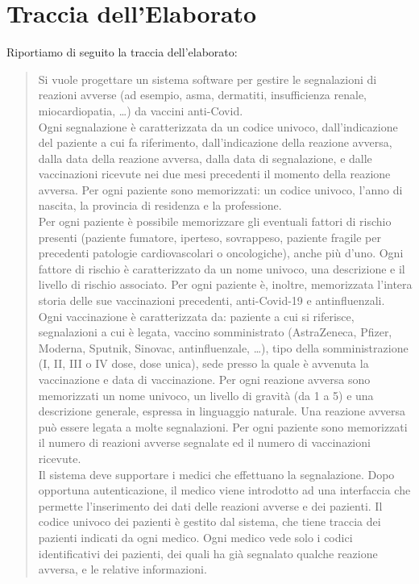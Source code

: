 \documentclass[11pt]{article}
\begin{document}
    \section{Traccia dell'Elaborato}
    Riportiamo di seguito la traccia dell'elaborato:
        \begin{quotation}
            Si vuole progettare un sistema software per gestire le segnalazioni di reazioni avverse (ad esempio, asma, dermatiti, insufficienza renale, miocardiopatia, \dots) da vaccini anti-Covid.\\
            Ogni segnalazione è caratterizzata da un codice univoco, dall'indicazione del paziente a cui fa riferimento, dall'indicazione della reazione avversa, dalla data della reazione avversa, dalla data di segnalazione, e dalle vaccinazioni ricevute nei due mesi precedenti il momento della reazione avversa.
            Per ogni paziente sono memorizzati: un codice univoco, l'anno di nascita, la provincia di residenza e la professione.\\
            Per ogni paziente è possibile memorizzare gli eventuali fattori di rischio presenti (paziente fumatore, iperteso, sovrappeso, paziente fragile per precedenti patologie cardiovascolari o oncologiche), anche più d'uno. Ogni fattore di rischio è caratterizzato da un nome univoco, una descrizione e il livello di rischio associato. Per ogni paziente è, inoltre, memorizzata l'intera storia delle sue vaccinazioni precedenti, anti-Covid-19 e antinfluenzali.\\
            Ogni vaccinazione è caratterizzata da: paziente a cui si riferisce, segnalazioni a cui è legata, vaccino somministrato (AstraZeneca, Pfizer, Moderna, Sputnik, Sinovac, antinfluenzale, \dots), tipo della somministrazione (I, II, III o IV dose, dose unica), sede presso la quale è avvenuta la vaccinazione e data di vaccinazione. Per ogni reazione avversa sono memorizzati un nome univoco, un livello di gravità (da 1 a 5) e una descrizione generale, espressa in linguaggio naturale. Una reazione avversa può essere legata a molte segnalazioni. Per ogni paziente sono memorizzati il numero di reazioni avverse segnalate ed il numero di vaccinazioni ricevute.\\
            Il sistema deve supportare i medici che effettuano la segnalazione. Dopo opportuna autenticazione, il medico viene introdotto ad una interfaccia che permette l'inserimento dei dati delle reazioni avverse e dei pazienti. Il codice univoco dei pazienti è gestito dal sistema, che tiene traccia dei pazienti indicati da ogni medico. Ogni medico vede solo i codici identificativi dei pazienti, dei quali ha già segnalato qualche reazione avversa, e le relative informazioni.\\

\end{quotation}
\end{document}
